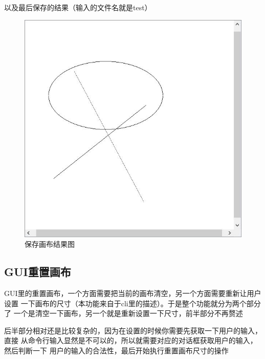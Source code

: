 \documentclass[a4paper,UTF8]{article}
\theoremstyle{definition}
\begin{document}
以及最后保存的结果（输入的文件名就是test）
\begin{figure}[h]
	\centering
	\includegraphics[scale=0.5]{figure/test.jpg}
	\caption{保存画布结果图}
	\label{fig:SaveCanvas}
\end{figure}

\subsection{GUI重置画布}
GUI里的重置画布，一个方面需要把当前的画布清空，另一个方面需要重新让用户设置
一下画布的尺寸（本功能来自于cli里的描述）。于是整个功能就分为两个部分了
一个是清空一下画布，另一个就是重新设置一下尺寸，前半部分不再赘述

后半部分相对还是比较复杂的，因为在设置的时候你需要先获取一下用户的输入，直接
从命令行输入显然是不可以的，所以就需要对应的对话框获取用户的输入，然后判断一下
用户的输入的合法性，最后开始执行重置画布尺寸的操作
\end{document}
